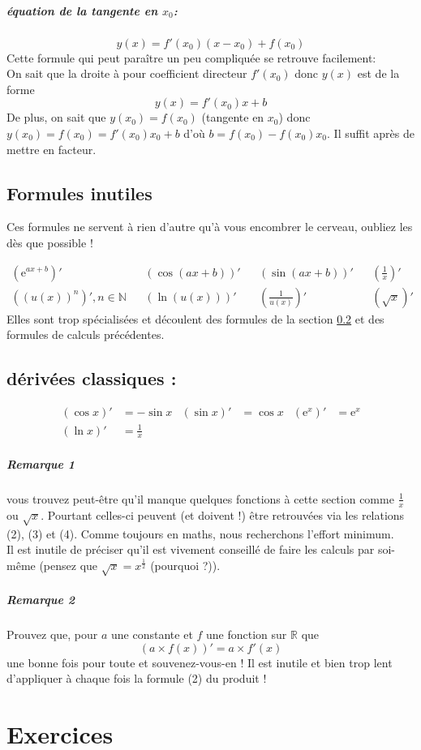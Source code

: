 \documentclass[11pt]{article}
\newcommand{\R}{\mathbb R}
\newcommand{\de}[1]{\left(#1\right)'}
\newcommand{\e}[1]{\mathrm{e}^{#1}}
\begin{document}
        \subparagraph{équation de la tangente en $x_0$:}
        \begin{equation*}
            y(x)=f'(x_0)(x-x_0) +f(x_0) 
        \end{equation*}
        Cette formule qui peut paraître un peu compliquée se retrouve facilement:\\
        On sait que la droite à pour coefficient directeur $f'(x_0)$ donc $y(x)$ est de la forme
        \begin{equation*}
            y(x)=f'(x_0)x+b
        \end{equation*}
        De plus, on sait que $y(x_0)=f(x_0)$ (tangente en $x_0$) donc $y(x_0)=f(x_0)= f'(x_0)x_0 +b$ d'où $b=f(x_0) -f(x_0)x_0$. Il suffit après de mettre en facteur.

        \subsection{Formules inutiles}
        Ces formules ne servent à rien d'autre qu'à vous encombrer le cerveau, oubliez les dès que possible !

        \begin{align*}
            \de{\e{ax+b}} && \de{\cos(ax+b)} && \de{\sin(ax+b)} && \de{\frac{1}{x}}\\
            \de{(u(x))^n}, n\in\mathbb{N} && \de{\ln(u(x))} && \de{\frac{1}{u(x)}} && \de{\sqrt{x}}
        \end{align*}
        Elles sont trop spécialisées et découlent des formules de la section \ref{derClassiques} et des formules de calculs précédentes.

        \subsection{dérivées classiques :} \label{derClassiques}
        \begin{align*}
            \de{\cos{x}} &= -\sin{x} &\de{\sin{x}} &= \cos{x} & \de{\e{x}} &= \e{x} \\
            \de{\ln{x}} &= \frac{1}{x} 
        \end{align*}
        \subparagraph{Remarque 1} vous trouvez peut-être qu'il manque quelques fonctions à cette section comme $\frac{1}{x}$ ou $\sqrt{x}$. Pourtant celles-ci peuvent (et doivent !) être retrouvées via les relations (2), (3) et (4). Comme toujours en maths, nous recherchons l'effort minimum.\\
        Il est inutile de préciser qu'il est vivement conseillé de faire les calculs par soi-même (pensez que $\sqrt{x} = x^{\frac{1}{2}}$ (pourquoi ?)).
        \subparagraph{Remarque 2} Prouvez que, pour $a$ une constante et $f$ une fonction sur $\R$ que
        \begin{equation*}
         \de{a\times f(x)} = a\times f'(x)
        \end{equation*}
         une bonne fois pour toute et souvenez-vous-en ! Il est inutile et bien trop lent d'appliquer à chaque fois la formule (2) du produit !  

    \section{Exercices}
\end{document}

